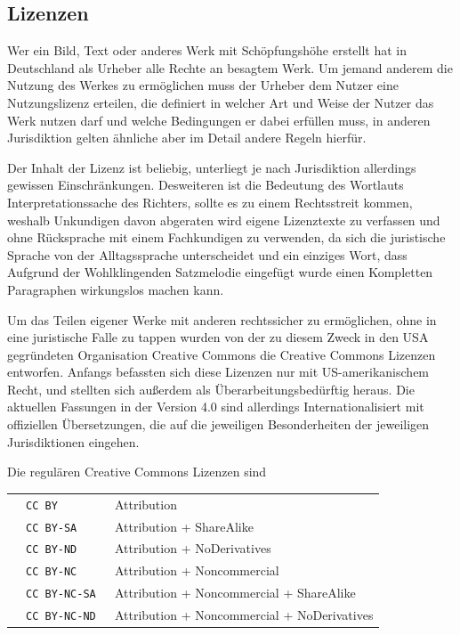 \subsection{Lizenzen}

Wer ein Bild, Text oder anderes Werk mit Schöpfungshöhe erstellt hat in
Deutschland als Urheber alle Rechte an besagtem Werk. Um jemand anderem die
Nutzung des Werkes zu ermöglichen muss der Urheber dem Nutzer eine
Nutzungslizenz erteilen, die definiert in welcher Art und Weise der Nutzer das
Werk nutzen darf und welche Bedingungen er dabei erfüllen muss, in anderen
Jurisdiktion gelten ähnliche aber im Detail andere Regeln hierfür.

Der Inhalt der Lizenz ist beliebig, unterliegt je nach Jurisdiktion allerdings
gewissen Einschränkungen. Desweiteren ist die Bedeutung des Wortlauts
Interpretationssache des Richters, sollte es zu einem Rechtsstreit kommen,
weshalb Unkundigen davon abgeraten wird eigene Lizenztexte zu verfassen und ohne
Rücksprache mit einem Fachkundigen zu verwenden, da sich die juristische Sprache
von der Alltagssprache unterscheidet und ein einziges Wort, dass Aufgrund der
Wohlklingenden Satzmelodie eingefügt wurde einen Kompletten Paragraphen
wirkungslos machen kann.

Um das Teilen eigener Werke mit anderen rechtssicher zu ermöglichen, ohne in
eine juristische Falle zu tappen wurden von der zu diesem Zweck in den USA
gegründeten Organisation Creative Commons die Creative Commons Lizenzen
entworfen. Anfangs befassten sich diese Lizenzen nur mit US-amerikanischem
Recht, und stellten sich außerdem als Überarbeitungsbedürftig heraus. Die
aktuellen Fassungen in der Version 4.0 sind allerdings Internationalisiert mit
offiziellen Übersetzungen, die auf die jeweiligen Besonderheiten der jeweiligen
Jurisdiktionen eingehen. \cite{CC}

Die regulären Creative Commons Lizenzen sind

\begin{tabular}{ c l l }
  & \texttt{CC BY \cite{CC-BY}} & Attribution \\
  & \texttt{CC BY-SA \cite{CC-BY-SA}} & Attribution + ShareAlike \\
  & \texttt{CC BY-ND \cite{CC-BY-ND}} & Attribution + NoDerivatives \\
  & \texttt{CC BY-NC \cite{CC-BY-NC}} & Attribution + Noncommercial \\
  & \texttt{CC BY-NC-SA \cite{CC-BY-NC-SA}} & Attribution + Noncommercial + ShareAlike \\
  & \texttt{CC BY-NC-ND \cite{CC-BY-NC-ND}} &  Attribution + Noncommercial + NoDerivatives
\end{tabular}

